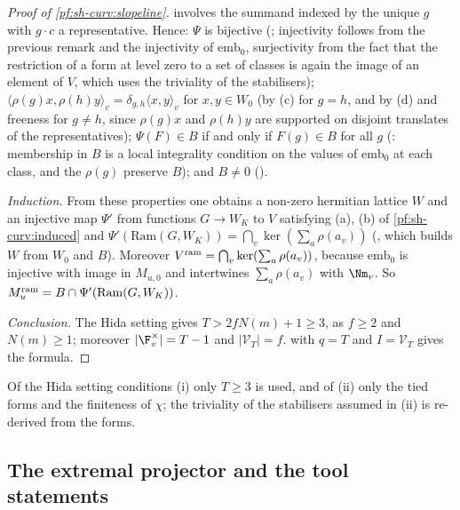 \begin{proof}[Proof of \cref{pf:sh-curv:slopeline}]
involves the summand indexed by the unique $g$ with $g\cdot c$ a representative. Hence:
$\Psi$ is bijective (; injectivity
follows from the previous remark and the injectivity of $\mathrm{emb}_0$, surjectivity from the fact that the restriction of
a form at level zero to a set of classes is again the image of an element of $V$, which uses the triviality of the
stabilisers); $\langle\rho(g)x,\rho(h)y\rangle_v=\delta_{g,h}\langle x,y\rangle_v$ for $x,y\in W_0$ (by (c) for $g=h$, and
by (d) and freeness for $g\ne h$, since $\rho(g)x$ and $\rho(h)y$ are supported on disjoint translates of the
representatives); $\Psi(F)\in B$ if and only if $F(g)\in B$ for all $g$
(: membership in $B$ is a local
integrality condition on the values of $\mathrm{emb}_0$ at each class, and the $\rho(g)$ preserve $B$); and $B\ne0$
().

\emph{Induction.} From these properties one obtains a non-zero hermitian lattice $W$ and an injective map $\Psi'$ from
functions $G\to W_K$ to $V$ satisfying (a), (b) of \cref{pf:sh-curv:induced} and
$\Psi'(\mathrm{Ram}(G,W_K))=\bigcap_v\ker(\sum_{a}\rho(a_v))$
(, which builds $W$ from $W_0$ and $B$). Moreover
$V^{\mathrm{ram}}=\bigcap_v\ker(\sum_a\rho(a_v))$, because $\mathrm{emb}_0$ is injective with image in $M_{u,0}$ and
intertwines $\sum_a\rho(a_v)$ with $\Nm_v$. So
$M_u^{\mathrm{ram}}=B\cap\Psi'(\mathrm{Ram}(G,W_K))$.

\emph{Conclusion.} The Hida setting gives $T>2fN(m)+1\ge3$, as $f\ge2$ and $N(m)\ge1$; moreover $|\F_v^\times|=T-1$ and
$|\mathcal V_T|=f$.  with $q=T$ and $I=\mathcal V_T$ gives the formula.
\end{proof}

\begin{remark}\label{pf:sh-curv:slopeline-rem}
Of the Hida setting conditions (i) only $T\ge3$ is used, and of (ii) only the tied forms and the finiteness of $\chi$;
the triviality of the stabilisers assumed in (ii) is re-derived from the forms.
\end{remark}

\subsection{The extremal projector and the tool statements}\label{sec:pf:sh-curv:ep}


